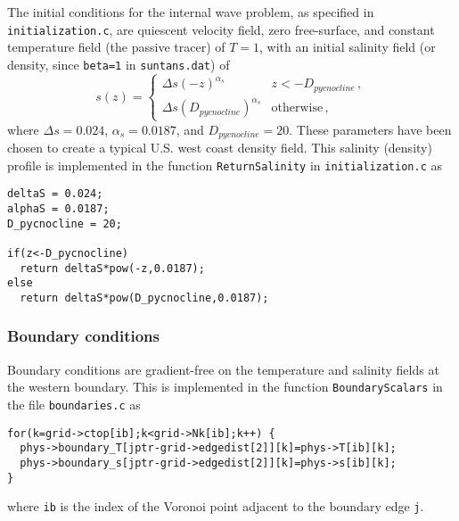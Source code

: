 The initial conditions for the internal wave problem, as specified in \verb+initialization.c+,
are quiescent velocity field, zero free-surface, and constant temperature field (the passive
tracer) of $T=1$, with an initial salinity field (or density, since
\verb+beta=1+ in \verb+suntans.dat+) of
\[
s(z) = \left\{\begin{array}{ll}
\Delta s\left(-z\right)^{\alpha_s} & z<-D_{pycnocline}\,,\\
\Delta s\left(D_{pycnocline}\right)^{\alpha_s} & \mbox{otherwise}\,,
\end{array}\right.
\]
where $\Delta s = 0.024$, $\alpha_s = 0.0187$, and $D_{pycnocline} = 20$.  These
parameters have been chosen to create a typical U.S. west coast density field.
This salinity (density) profile is 
implemented in the function \verb+ReturnSalinity+ in \verb+initialization.c+ as
\begin{verbatim}
deltaS = 0.024;
alphaS = 0.0187;
D_pycnocline = 20;

if(z<-D_pycnocline)
  return deltaS*pow(-z,0.0187);
else
  return deltaS*pow(D_pycnocline,0.0187);
\end{verbatim}

\subsubsection{Boundary conditions}

Boundary conditions are gradient-free on the temperature and salinity fields at the western
boundary.  This is implemented in the function \verb+BoundaryScalars+ in the file \verb+boundaries.c+
as
\begin{verbatim}
for(k=grid->ctop[ib];k<grid->Nk[ib];k++) {
  phys->boundary_T[jptr-grid->edgedist[2]][k]=phys->T[ib][k];
  phys->boundary_s[jptr-grid->edgedist[2]][k]=phys->s[ib][k];
}
\end{verbatim}
where \verb+ib+ is the index of the Voronoi point adjacent to the boundary edge \verb+j+.

